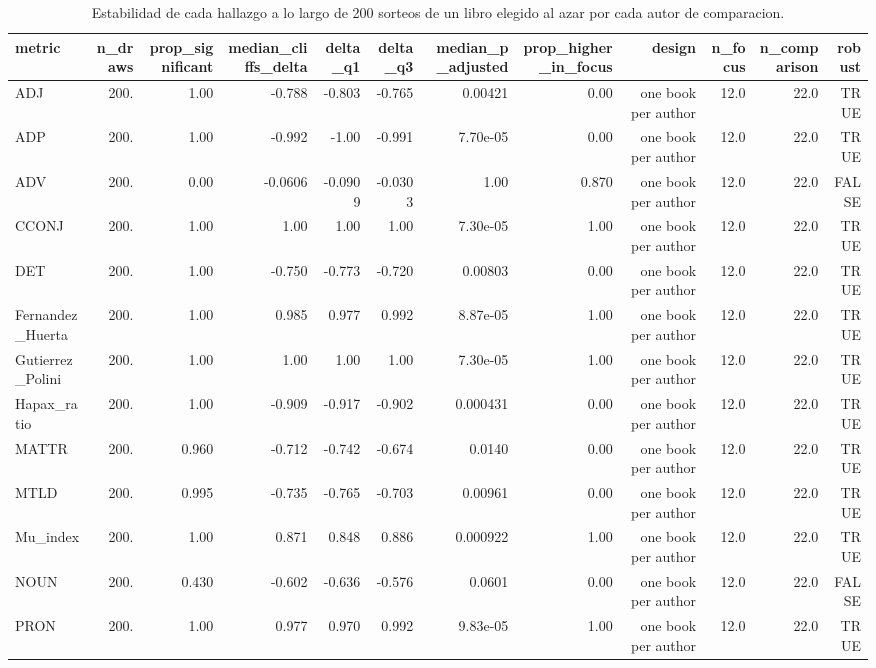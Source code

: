 \begin{table}[htbp]
\centering
\small
\caption{Estabilidad de cada hallazgo a lo largo de 200 sorteos de un libro elegido al azar por cada autor de comparacion.}
\label{tab:sensitivity-author-es}
\begin{tabular}{lrrrrrrrrrrr}
\toprule
\textbf{metric} & \textbf{n\_draws} & \textbf{prop\_significant} & \textbf{median\_cliffs\_delta} & \textbf{delta\_q1} & \textbf{delta\_q3} & \textbf{median\_p\_adjusted} & \textbf{prop\_higher\_in\_focus} & \textbf{design} & \textbf{n\_focus} & \textbf{n\_comparison} & \textbf{robust} \\
\midrule
ADJ & 200. & 1.00 & -0.788 & -0.803 & -0.765 & 0.00421 & 0.00 & one book per author & 12.0 & 22.0 & TRUE \\
ADP & 200. & 1.00 & -0.992 & -1.00 & -0.991 & 7.70e-05 & 0.00 & one book per author & 12.0 & 22.0 & TRUE \\
ADV & 200. & 0.00 & -0.0606 & -0.0909 & -0.0303 & 1.00 & 0.870 & one book per author & 12.0 & 22.0 & FALSE \\
CCONJ & 200. & 1.00 & 1.00 & 1.00 & 1.00 & 7.30e-05 & 1.00 & one book per author & 12.0 & 22.0 & TRUE \\
DET & 200. & 1.00 & -0.750 & -0.773 & -0.720 & 0.00803 & 0.00 & one book per author & 12.0 & 22.0 & TRUE \\
Fernandez\_Huerta & 200. & 1.00 & 0.985 & 0.977 & 0.992 & 8.87e-05 & 1.00 & one book per author & 12.0 & 22.0 & TRUE \\
Gutierrez\_Polini & 200. & 1.00 & 1.00 & 1.00 & 1.00 & 7.30e-05 & 1.00 & one book per author & 12.0 & 22.0 & TRUE \\
Hapax\_ratio & 200. & 1.00 & -0.909 & -0.917 & -0.902 & 0.000431 & 0.00 & one book per author & 12.0 & 22.0 & TRUE \\
MATTR & 200. & 0.960 & -0.712 & -0.742 & -0.674 & 0.0140 & 0.00 & one book per author & 12.0 & 22.0 & TRUE \\
MTLD & 200. & 0.995 & -0.735 & -0.765 & -0.703 & 0.00961 & 0.00 & one book per author & 12.0 & 22.0 & TRUE \\
Mu\_index & 200. & 1.00 & 0.871 & 0.848 & 0.886 & 0.000922 & 1.00 & one book per author & 12.0 & 22.0 & TRUE \\
NOUN & 200. & 0.430 & -0.602 & -0.636 & -0.576 & 0.0601 & 0.00 & one book per author & 12.0 & 22.0 & FALSE \\
PRON & 200. & 1.00 & 0.977 & 0.970 & 0.992 & 9.83e-05 & 1.00 & one book per author & 12.0 & 22.0 & TRUE \\

\end{tabular}
\end{table}
